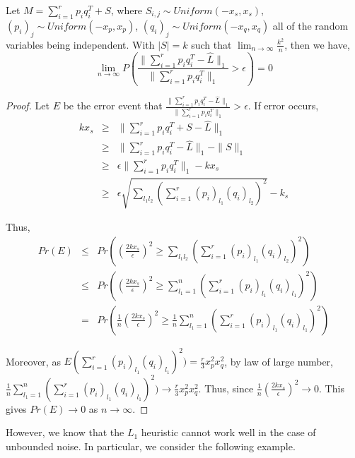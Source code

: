 \begin{prop}
Let $M=\sum_{i=1}^{r}p_{i}q_{i}^{T}+S$, where $S_{i,j}\sim Uniform(-x_{s},x_{s})$,
$(p_{i})_{j}\sim Uniform(-x_{p},x_{p})$, $(q_{i})_{j}\sim Uniform(-x_{q},x_{q})$
all of the random variables being independent. With $|S|=k$ such that
$\lim_{n\to\infty}\frac{k^{2}}{n}$, then we have,
\[
\lim_{n \to \infty} P \left( \frac{ \|\sum_{i=1}^{r} p_{i} q_{i}^{T} - \hat{L} \|_{1} }{ \| \sum_{i=1}^{r} p_{i} q_{i}^{T} \|_{1} } > \epsilon \right) = 0
\]
\end{prop}

\begin{proof}
Let $E$ be the error event that $\frac{\|\sum_{i=1}^{r}p_{i}q_{i}^{T}-\hat{L}\|_{1}}{\|\sum_{i=1}^{r}p_{i}q_{i}^{T}\|_{1}}>\epsilon$.
If error occurs,
\begin{eqnarray*}
kx_{s} & \ge & \|\sum_{i=1}^{r}p_{i}q_{i}^{T}+S-\hat{L}\|_{1}\\
 & \ge & \|\sum_{i=1}^{r}p_{i}q_{i}^{T}-\hat{L}\|_{1}-\|S\|_{1}\\
 & \ge & \epsilon\|\sum_{i=1}^{r}p_{i}q_{i}^{T}\|_{1}-kx_{s}\\
 & \ge & \epsilon\sqrt{\sum_{l_{1}l_{2}}(\sum_{i=1}^{r}(p_{i})_{l_{1}}(q_{i})_{l_{2}})^{2}}-k_{s}
\end{eqnarray*}


Thus,
\begin{eqnarray*}
Pr(E)
&\le & Pr \left( \left( \frac{2kx_{s}}{\epsilon} \right)^{2} \ge \sum_{l_{1}l_{2}} \left( \sum_{i=1}^{r}(p_{i})_{l_{1}}(q_{i})_{l_{2}} \right)^{2} \right)\\
&\le & Pr \left( \left( \frac{2kx_{s}}{\epsilon} \right)^{2} \ge \sum_{l_{1}=1}^{n} \left( \sum_{i=1}^{r}(p_{i})_{l_{1}}(q_{i})_{l_{1}} \right)^{2} \right)\\
&= & Pr \left( \frac{1}{n} \left( \frac{2kx_{s}}{\epsilon} \right)^{2} \ge \frac{1}{n} \sum_{l_{1}=1}^{n} \left( \sum_{i=1}^{r}(p_{i})_{l_{1}}(q_{i})_{l_{1}} \right)^{2} \right)
\end{eqnarray*}


Moreover, as $E(\sum_{i=1}^{r}(p_{i})_{l_{1}}(q_{i})_{l_{1}})^{2})=\frac{r}{3}x_{p}^{2}x_{q}^{2}$,
by law of large number, $\frac{1}{n}\sum_{l_{1}=1}^{n}(\sum_{i=1}^{r}(p_{i})_{l_{1}}(q_{i})_{l_{1}})^{2})\to\frac{r}{3}x_{p}^{2}x_{q}^{2}$.
Thus, since $\frac{1}{n}(\frac{2kx_{s}}{\epsilon})^{2}\to0$. This
gives $Pr(E)\to0$ as $n\to\infty$.
\end{proof}

However, we know that the $L_1$ heuristic cannot work well in the case of unbounded noise. In particular, we consider the following example.

